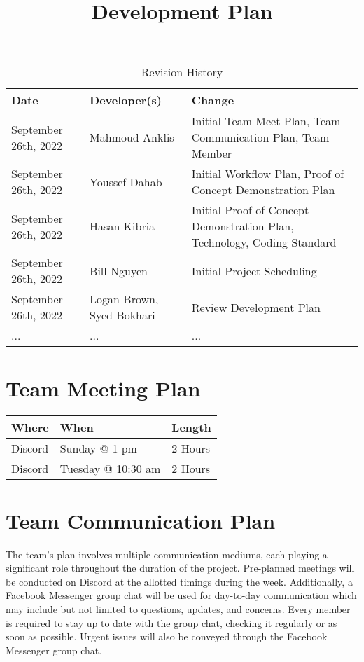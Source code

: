 \documentclass{article}
\title{Development Plan\\\progname}
\author{\authname}
\date{}
\begin{document}
\begin{table}[hp]
	\caption{Revision History} \label{TblRevisionHistory}
	\begin{tabularx}{\textwidth}{llX}
		\toprule
		\textbf{Date} & \textbf{Developer(s)} & \textbf{Change}\\
		\midrule
		September 26th, 2022 & Mahmoud Anklis  & Initial Team Meet Plan, Team Communication Plan, Team Member\\
		September 26th, 2022 & Youssef Dahab  & Initial Workflow Plan, Proof of Concept Demonstration Plan \\
		September 26th, 2022 & Hasan Kibria  & Initial Proof of Concept Demonstration Plan, Technology, Coding Standard \\
		September 26th, 2022 & Bill Nguyen  & Initial Project Scheduling \\
		September 26th, 2022 & Logan Brown, Syed Bokhari & Review Development Plan\\
		... & ... & ...\\
		\bottomrule
	\end{tabularx}
\end{table}

\newpage

\maketitle


\section{Team Meeting Plan}
\begin{table}[hp]
\begin{tabularx}{\textwidth}{|l|l|X|}
\toprule
\textbf{Where} & \textbf{When} & \textbf{Length}\\
\midrule
Discord & Sunday @ 1 pm & 2 Hours\\
Discord & Tuesday @ 10:30 am & 2 Hours\\
\bottomrule
\end{tabularx}
\end{table}

\section{Team Communication Plan}
The team’s plan involves multiple communication mediums, each playing a significant role throughout the duration of the project. Pre-planned meetings will be conducted on Discord at the allotted timings during the week. Additionally, a Facebook Messenger group chat will be used for day-to-day communication which may include but not limited to questions, updates, and concerns. Every member is required to stay up to date with the group chat, checking it regularly or as soon as possible. Urgent issues will also be conveyed through the Facebook Messenger group chat. 
\end{document}
